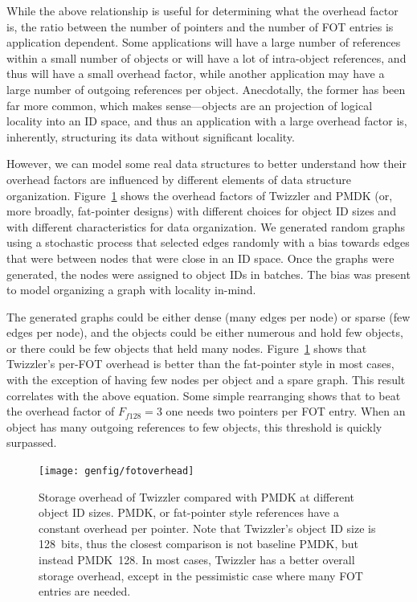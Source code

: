 While the above relationship is useful for determining what the overhead factor is, the ratio
between the number of pointers and the number of FOT entries is application dependent. Some
applications will have a large number of references within a small number of objects or will have a
lot of intra-object references, and thus will have a small overhead factor, while another
application may have a large number of outgoing references per object. Anecdotally, the former has
been far more common, which makes sense---objects are an projection of logical locality into an ID
space, and thus an application with a large overhead factor is, inherently, structuring its data
without significant locality.

However, we can model some real data structures to better understand how their overhead factors are
influenced by different elements of data structure organization. Figure~\ref{fig:fotoverhead} shows
the overhead factors of Twizzler and PMDK (or, more broadly, fat-pointer designs) with different
choices for object ID sizes and with different characteristics for data organization. We generated
random graphs using a stochastic process that selected edges randomly with a bias towards edges that
were between nodes that were close in an ID space. Once the graphs were generated, the nodes were
assigned to object IDs in batches. The bias was present to model organizing a graph with locality
in-mind.

The generated graphs could be either dense (many edges per node) or sparse (few edges per node), and
the objects could be either numerous and hold few objects, or there could be few objects that held
many nodes. Figure~\ref{fig:fotoverhead} shows that Twizzler's per-FOT overhead is better than the
fat-pointer style in most cases, with the exception of having few nodes per object and a spare
graph. This result correlates with the above equation. Some simple rearranging shows that to beat
the overhead factor of $F_{f128} = 3$ one needs two pointers per FOT entry. When an object has many
outgoing references to few objects, this threshold is quickly surpassed.


\begin{figure}
    \centering
    \texttt{[image: genfig/fotoverhead]}
    \caption{Storage overhead of Twizzler compared with PMDK at different object ID sizes. PMDK, or fat-pointer style references have a constant overhead per pointer. Note that Twizzler's object ID size is 128~bits, thus the closest comparison is not baseline PMDK, but instead PMDK~128. In most cases, Twizzler has a better overall storage overhead, except in the pessimistic case where many FOT entries are needed.}
    \label{fig:fotoverhead}
\end{figure}




